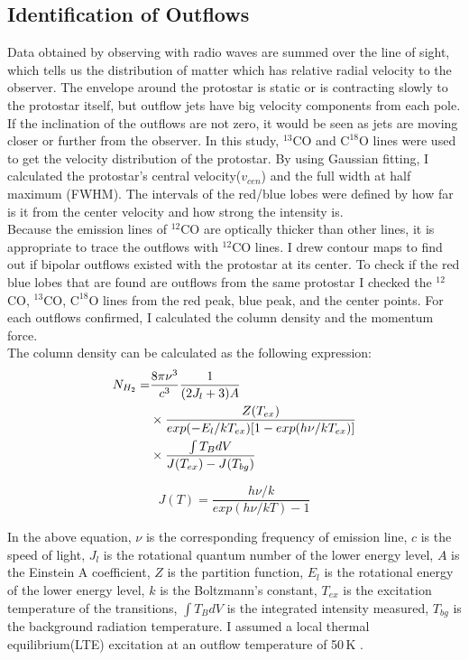 \subsection{Identification of Outflows}
Data obtained by observing with radio waves are summed over the line of sight, which tells us the distribution of matter which has relative radial velocity to the observer. The envelope around the protostar is static or is contracting slowly to the protostar itself, but outflow jets have big velocity components from each pole. If the inclination of the outflows are not zero, it would be seen as jets are moving closer or further from the observer. In this study, $^{13}$CO and $\textrm{C}^{18}\textrm{O}$ lines were used to get the velocity distribution of the protostar. By using Gaussian fitting, I calculated the protostar’s central velocity($v_{cen}$) and the full width at half maximum (FWHM). The intervals of the red/blue lobes were defined by how far is it from the center velocity and how strong the intensity is. \\
Because the emission lines of $^{12}$CO are optically thicker than other lines, it is appropriate to trace the outflows with $^{12}$CO lines. I drew contour maps to find out if bipolar outflows existed with the protostar at its center. To check if the red blue lobes that are found are outflows from the same protostar I checked the $^{12}$CO, $^{13}$CO, $\textrm{C}^{18}\textrm{O}$ lines from the red peak, blue peak, and the center points. For each outflows confirmed, I calculated the column density and the momentum force. \\



The column density can be calculated as the following expression:
\begin{align}
	N_{H_2} =& \frac{8\pi \nu^3}{c^3} \frac{1}{(2J_l +3)A}  \notag \\
	& \times \frac{Z(T_{ex})}{exp(-E_l / kT_{ex})[1-exp(h\nu / kT_{ex})]} \notag \\
	& \times \frac{\int T_B dV}{J(T_{ex})-J(T_{bg})}
\end{align}

\begin{equation}
J(T) = \frac{h \nu / k}{exp(h\nu / kT)-1}
\end{equation}

In the above equation, $\nu$ is the corresponding frequency of emission line, $c$ is the speed of light, $J_l$ is the rotational quantum number of the lower energy level, $A$ is the Einstein A coefficient, $Z$ is the partition function, $E_l$ is the rotational energy of the lower energy level, $k$ is the Boltzmann's constant, $T_{ex}$ is the excitation temperature of the transitions, $\int T_B dV$ is the integrated intensity measured, $T_{bg}$ is the background radiation temperature. I assumed a local thermal equilibrium(LTE) excitation at an outflow temperature of 50$\,$K \cite{takahashi2008millimeter}.\\

